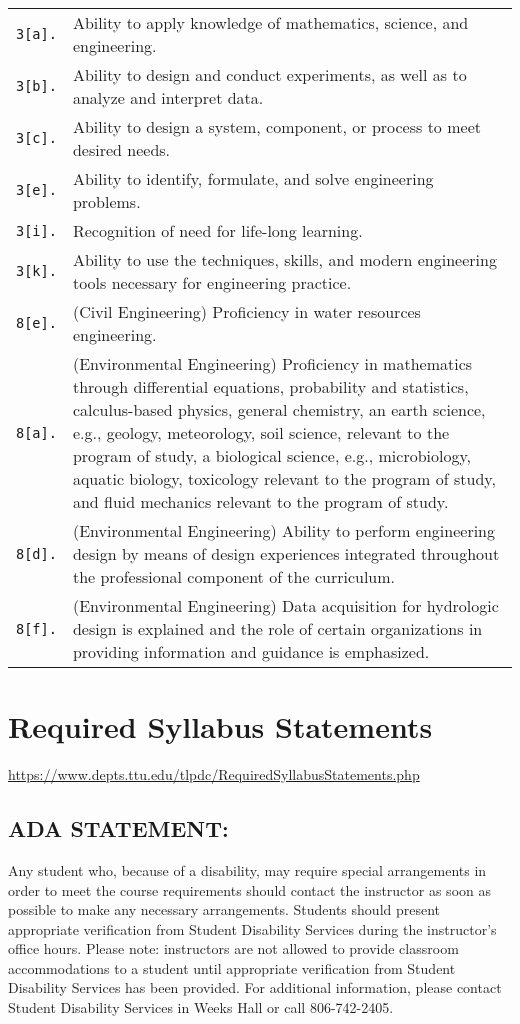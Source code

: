\documentclass[12pt]{article}
\begin{document}
\begin{tabular}{p{0.5in}p{5.5in}}
\texttt{3[a].}  & Ability to apply knowledge of mathematics, science, and engineering.\\
\texttt{3[b].}  & Ability to design and conduct experiments, as well as to analyze and interpret data.\\
\texttt{3[c].}  & Ability to design a system, component, or process to meet desired needs.\\
\texttt{3[e].}  & Ability to identify, formulate, and solve engineering problems.\\
\texttt{3[i].}   & Recognition of need for life-long learning.\\
\texttt{3[k].}  & Ability to use the techniques, skills, and modern engineering tools necessary for engineering practice.\\
\texttt{8[e].}  & (Civil Engineering) Proficiency in water resources engineering. \\
\texttt{8[a].} & (Environmental Engineering) Proficiency in mathematics through differential
equations, probability and statistics, calculus-based physics, general chemistry, an earth
science, e.g., geology, meteorology, soil science, relevant to the program of study, a biological
science, e.g., microbiology, aquatic biology, toxicology relevant to the program of study, and
fluid mechanics relevant to the program of study. \\
\texttt{8[d].} & (Environmental Engineering) Ability to perform engineering design by means of
design experiences integrated throughout the professional component of the curriculum. \\
\texttt{8[f].} & (Environmental Engineering) Data acquisition for hydrologic design is explained and
the role of certain organizations in providing information and guidance is emphasized. \\
\end{tabular}

\clearpage
%

\section*{Required Syllabus Statements}
\url{https://www.depts.ttu.edu/tlpdc/RequiredSyllabusStatements.php}
\subsection*{ADA STATEMENT:}
Any student who, because of a disability, may require special arrangements in order to meet the course requirements should contact the instructor as soon as possible to make any necessary arrangements. Students should present appropriate verification from Student Disability Services during the instructor's office hours. Please note: instructors are not allowed to provide classroom accommodations to a student until appropriate verification from Student Disability Services has been provided. For additional information, please contact Student Disability Services in Weeks Hall or call 806-742-2405.
\end{document}
